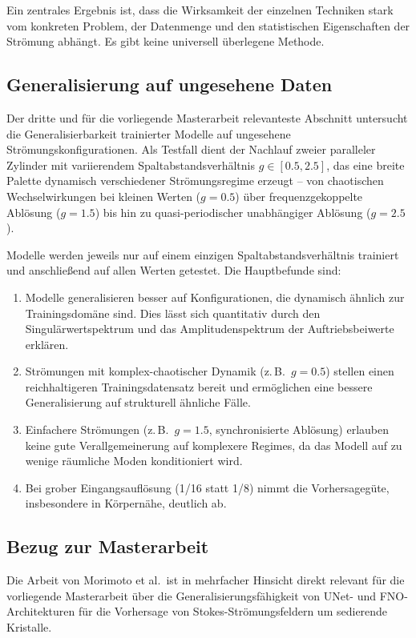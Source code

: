 \documentclass[a4paper,12pt]{article}
\begin{document}
Ein zentrales Ergebnis ist, dass die Wirksamkeit der einzelnen Techniken stark vom konkreten Problem, der Datenmenge und den statistischen Eigenschaften der Strömung abhängt. Es gibt keine universell überlegene Methode.

\subsection*{Generalisierung auf ungesehene Daten}

Der dritte und für die vorliegende Masterarbeit relevanteste Abschnitt untersucht die Generalisierbarkeit trainierter Modelle auf ungesehene Strömungskonfigurationen. Als Testfall dient der Nachlauf zweier paralleler Zylinder mit variierendem Spaltabstandsverhältnis $g \in [0.5, 2.5]$, das eine breite Palette dynamisch verschiedener Strömungsregime erzeugt -- von chaotischen Wechselwirkungen bei kleinen Werten ($g = 0.5$) über frequenzgekoppelte Ablösung ($g = 1.5$) bis hin zu quasi-periodischer unabhängiger Ablösung ($g = 2.5$).

Modelle werden jeweils nur auf einem einzigen Spaltabstandsverhältnis trainiert und anschließend auf allen Werten getestet. Die Hauptbefunde sind:

\begin{enumerate}
    \item Modelle generalisieren besser auf Konfigurationen, die dynamisch ähnlich zur Trainingsdomäne sind. Dies lässt sich quantitativ durch den Singulärwertspektrum und das Amplitudenspektrum der Auftriebsbeiwerte erklären.
    \item Strömungen mit komplex-chaotischer Dynamik (z.\,B.\ $g = 0.5$) stellen einen reichhaltigeren Trainingsdatensatz bereit und ermöglichen eine bessere Generalisierung auf strukturell ähnliche Fälle.
    \item Einfachere Strömungen (z.\,B.\ $g = 1.5$, synchronisierte Ablösung) erlauben keine gute Verallgemeinerung auf komplexere Regimes, da das Modell auf zu wenige räumliche Moden konditioniert wird.
    \item Bei grober Eingangsauflösung (1/16 statt 1/8) nimmt die Vorhersagegüte, insbesondere in Körpernähe, deutlich ab.
\end{enumerate}

\subsection*{Bezug zur Masterarbeit}

Die Arbeit von Morimoto et al.\ ist in mehrfacher Hinsicht direkt relevant für die vorliegende Masterarbeit über die Generalisierungsfähigkeit von UNet- und FNO-Architekturen für die Vorhersage von Stokes-Strömungsfeldern um sedierende Kristalle.
\end{document}
